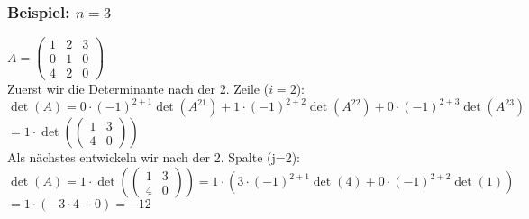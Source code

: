 \begin{frame}\frametitle{Beispiel: $n=3$}
$A=\begin{pmatrix} 1 & 2 & 3 \\ 0 & 1 & 0 \\ 4 & 2 & 0 \end{pmatrix}$\\\pause\vfill
Zuerst  wir die Determinante nach der 2. Zeile ($i=2$): \\\pause\vfill
\small$\det(A)=0\cdot(-1)^{2+1}\det(A^{21})+1\cdot(-1)^{2+2}\det(A^{22})+0\cdot(-1)^{2+3}\det(A^{23})$\pause\\
\hspace{10.75mm}$=1\cdot\det(\begin{pmatrix} 1&3\\4&0 \end{pmatrix})$\\\pause \vfill
\normalsize Als nächstes entwickeln wir nach der 2. Spalte (j=2):\\\pause\vfill
\small $ \det(A)=1\cdot\det(\begin{pmatrix} 1&3\\4&0 \end{pmatrix})=1\cdot (3\cdot(-1)^{2+1}\det(4)+0\cdot(-1)^{2+2}\det(1))$\\\hspace{10.75mm}$=1\cdot(-3\cdot4 +0)=-12$
\end{frame}
%
